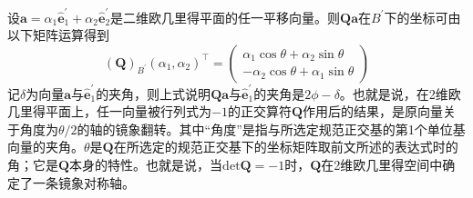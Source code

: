 \documentclass[main.tex]{subfiles}
\begin{document}
设$\mathbf{a}=\alpha_1\mathbf{\hat{e}}^\prime_1+\alpha_2\mathbf{\hat{e}}^\prime_2$是二维欧几里得平面的任一平移向量。则$\mathbf{Qa}$在$B^\prime$下的坐标可由以下矩阵运算得到
\[\left(\mathbf{Q}\right)_{B^\prime}\left(\alpha_1,\alpha_2\right)^\intercal=\left(\begin{array}{c}\alpha_1\cos\theta+\alpha_2\sin\theta\\-\alpha_2\cos\theta+\alpha_1\sin\theta\end{array}\right)\]
记$\delta$为向量$\mathbf{a}$与$\mathbf{\hat{e}}^\prime_1$的夹角，则上式说明$\mathbf{Qa}$与$\mathbf{\hat{e}}^\prime_1$的夹角是$2\phi-\delta$。也就是说，在2维欧几里得平面上，任一向量被行列式为$-1$的正交算符$\mathbf{Q}$作用后的结果，是原向量关于角度为$\theta/2$的轴的镜象翻转。其中“角度”是指与所选定规范正交基的第1个单位基向量的夹角。$\theta$是$\mathbf{Q}$在所选定的规范正交基下的坐标矩阵取前文所述的表达式时的角；它是$\mathbf{Q}$本身的特性。也就是说，当$\mathrm{det}\mathbf{Q}=-1$时，$\mathbf{Q}$在2维欧几里得空间中确定了一条镜象对称轴。
\end{document}
